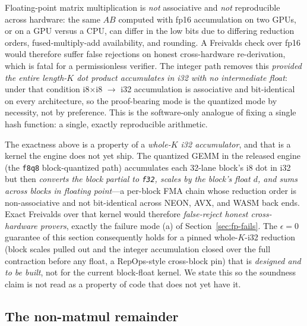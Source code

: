\begin{remark}
Floating-point matrix multiplication is \emph{not} associative and \emph{not}
reproducible across hardware: the same $A B$ computed with fp16 accumulation on two
GPUs, or on a GPU versus a CPU, can differ in the low bits due to differing reduction
orders, fused-multiply-add availability, and rounding. A Freivalds check over fp16
would therefore suffer false rejections on honest cross-hardware re-derivation, which
is fatal for a permissionless verifier. The integer path removes this \emph{provided the
entire length-$K$ dot product accumulates in i32 with no intermediate float}: under that
condition i8$\times$i8 $\to$ i32 accumulation is associative and bit-identical on every
architecture, so the proof-bearing mode is the quantized mode by necessity, not by
preference. This is the software-only analogue of fixing a single hash function: a
single, exactly reproducible arithmetic.
\end{remark}

\begin{remark}
\label{rem:wholek}
The exactness above is a property of a \emph{whole-$K$ i32 accumulator}, and that is a
kernel the engine does not yet ship. The quantized GEMM in the released engine (the
\texttt{f8q8} block-quantized path) accumulates each 32-lane block's i8 dot in i32 but
then \emph{converts the block partial to \texttt{f32}, scales by the block's float
$d$, and sums across blocks in floating point}---a per-block FMA chain whose reduction
order is non-associative and not bit-identical across NEON, AVX, and WASM back ends.
Exact Freivalds over that kernel would therefore \emph{false-reject honest
cross-hardware provers}, exactly the failure mode (a) of Section~\ref{sec:fp-fails}. The
$\epsilon = 0$ guarantee of this section consequently holds for a pinned whole-$K$-i32
reduction (block scales pulled out and the integer accumulation closed over the full
contraction before any float, a RepOps-style cross-block pin) that is \emph{designed and
to be built}, not for the current block-float kernel. We state this so the soundness
claim is not read as a property of code that does not yet have it.
\end{remark}

\subsection{The non-matmul remainder}


